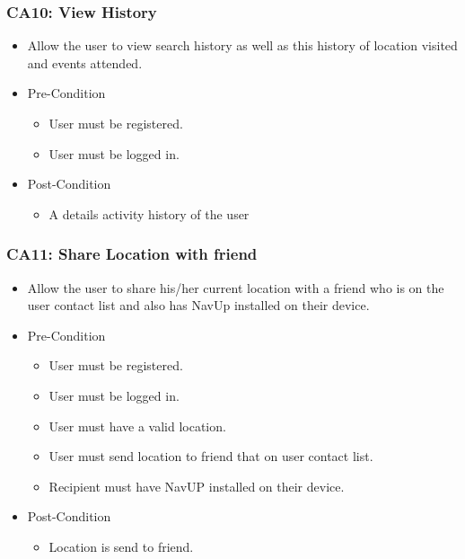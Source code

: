 \documentclass[12pt,a4paper]{article}
\begin{document}
		\subsubsection{CA10: View History}
			\begin{itemize}
				\item Allow the user to view search history as well as this history of location visited and events attended.
				\item Pre-Condition
					\begin{itemize}
						\item User must be registered.
						\item User must be logged in.
					\end{itemize}
				\item Post-Condition
					\begin{itemize}
						\item A details activity history of the user
					\end{itemize}
			\end{itemize}
		\subsubsection{CA11: Share Location with friend}
			\begin{itemize}
				\item Allow the user to share his/her current location with a friend who is on the user contact list and also has NavUp installed on their device.
				\item Pre-Condition
					\begin{itemize}
						\item User must be registered.
						\item User must be logged in.
						\item User must have a valid location.
						\item User must send location to friend that on user contact list.
						\item Recipient must have NavUP installed on their device.
					\end{itemize}
				\item Post-Condition
					\begin{itemize}
						\item Location is send to friend.
					\end{itemize}
			\end{itemize}
\end{document}
